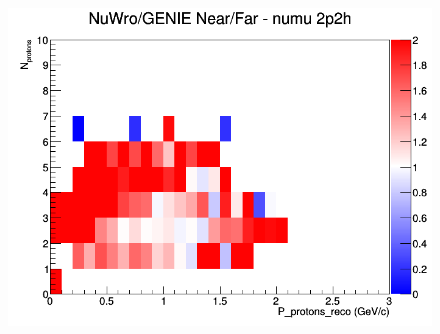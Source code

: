 \documentclass[12pt]{article}
\begin{document}
\begin{figure}[h]
\endminipage
{}
\includegraphics[width=\linewidth]{eff_N_P/GAr/protons/ratios/2p2h_NuWro_GENIE_numu_NF_N_P.png}
\endminipage
\newline
\end{figure}
\clearpage
\end{document}
